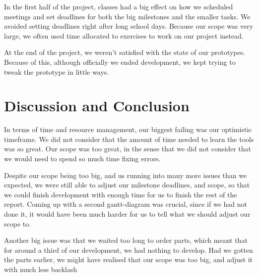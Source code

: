 In the first half of the project, classes had a big effect on how we scheduled meetings and set deadlines for both the big milestones and the smaller tasks. We avoided setting deadlines right after long school days. Because our scope was very large, we often used time allocated to exercises to work on our project instead.

At the end of the project, we weren't satisfied with the state of our prototypes. Because of this, although officially we ended development, we kept trying to tweak the prototype in little ways.

\section{Discussion and Conclusion}

In terms of time and resource management, our biggest failing was our optimistic timeframe. We did not consider that the amount of time needed to learn the tools was so great. Our scope was too great, in the sense that we did not consider that we would need to spend so much time fixing errors.

Despite our scope being too big, and us running into many more issues than we expected, we were still able to adjust our milestone deadlines, and scope, so that we could finish development with enough time for us to finish the rest of the report. Coming up with a second gantt-diagram was crucial, since if we had not done it, it would have been much harder for us to tell what we should adjust our scope to.

Another big issue was that we waited too long to order parts, which meant that for around a third of our development, we had nothing to develop. Had we gotten the parts earlier, we might have realised that our scope was too big, and adjust it with much less backlash

